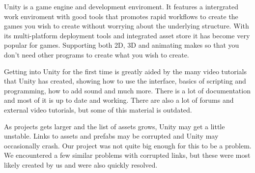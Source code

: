 
Unity is a game engine and development enviroment.
It features a intergrated work enviroment with good tools that promotes rapid workflows to create the games you wish to create without worrying about the underlying structure.
With its multi-platform deployment tools and integrated asset store it has become very popular for games.
Supporting both 2D, 3D and animating makes so that you don't need other programs to create what you wish to create.

Getting into Unity for the first time is greatly aided by the many video tutorials that Unity has created, showing how to use the interface, basics of scripting and programming, how to add sound and much more. There is a lot of documentation and most of it is up to date and working. There are also a lot of forums and external video tutorials, but some of this material is outdated.

As projects gets larger and the list of assets grows, Unity may get a little unstable. Links to assets and prefabs may be corrupted and Unity may occasionally crash. Our project was not quite big enough for this to be a problem. We encountered a few similar problems with corrupted links, but these were most likely created by us and were also quickly resolved. 

